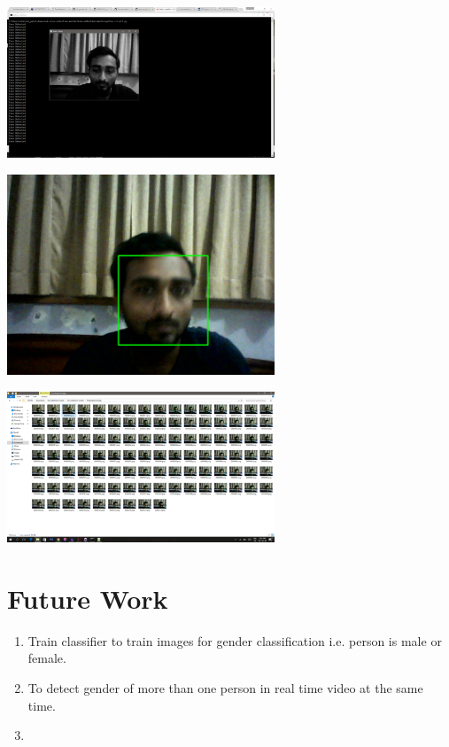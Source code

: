 \documentclass[journal]{IEEEtran}
\begin{document}
	\begin{minipage}{\linewidth}
		\centering
		\includegraphics[width = 80mm]{1.png}
	\end{minipage} 
	
	\begin{minipage}{\linewidth}
		\centering
		\includegraphics[width = 80mm]{2.png}
	\end{minipage} 
	
	\begin{minipage}{\linewidth}
		\centering
		\includegraphics[width = 80mm]{3.png}
	\end{minipage} 
	
	
    \section{\textbf{Future Work}}
    \begin{enumerate}
        \item Train classifier to train images for gender classification i.e. person is male or female.
        \item To detect gender of more than one person in real time video at the same time.
        \item 
    \end{enumerate}
	
\end{document}
